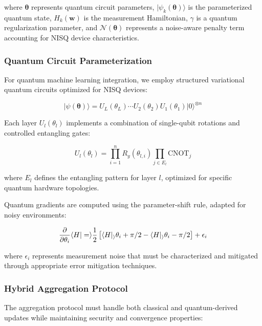 \documentclass[10pt,journal,compsoc]{IEEEtran}
\newcommand{\vect}[1]{\mathbf{#1}}
\newcommand{\ket}[1]{|#1\rangle}
\newcommand{\braket}[2]{\langle#1|#2\rangle}
\begin{document}
where $\boldsymbol{\theta}$ represents quantum circuit parameters, $\ket{\psi_k(\boldsymbol{\theta})}$ is the parameterized quantum state, $H_k(\vect{w})$ is the measurement Hamiltonian, $\gamma$ is a quantum regularization parameter, and $\mathcal{N}(\boldsymbol{\theta})$ represents a noise-aware penalty term accounting for NISQ device characteristics.

\subsubsection{Quantum Circuit Parameterization}

For quantum machine learning integration, we employ structured variational quantum circuits optimized for NISQ devices:

\begin{equation}
\ket{\psi(\boldsymbol{\theta})} = U_L(\theta_L) \cdots U_2(\theta_2) U_1(\theta_1) \ket{0}^{\otimes n}
\label{eq:vqc_state}
\end{equation}

Each layer $U_l(\theta_l)$ implements a combination of single-qubit rotations and controlled entangling gates:

\begin{equation}
U_l(\theta_l) = \prod_{i=1}^{n} R_y(\theta_{l,i}) \prod_{j \in E_l} \text{CNOT}_{j}
\label{eq:quantum_layer}
\end{equation}

where $E_l$ defines the entangling pattern for layer $l$, optimized for specific quantum hardware topologies.

Quantum gradients are computed using the parameter-shift rule, adapted for noisy environments:

\begin{equation}
\frac{\partial}{\partial \theta_i} \braket{H} = \frac{1}{2}\left[\braket{H}_{\theta_i + \pi/2} - \braket{H}_{\theta_i - \pi/2}\right] + \epsilon_i
\label{eq:noisy_gradient}
\end{equation}

where $\epsilon_i$ represents measurement noise that must be characterized and mitigated through appropriate error mitigation techniques.

\subsubsection{Hybrid Aggregation Protocol}

The aggregation protocol must handle both classical and quantum-derived updates while maintaining security and convergence properties:
\end{document}
